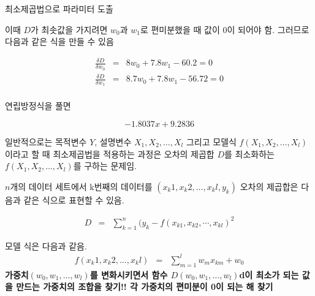 \documentclass[10pt,t]{beamer}
\begin{document}
\begin{frame} {최소제곱법으로 파라미터 도출}
\pagebreak 

이때 $D$가 최솟값을 가지려면 $w_0$과 $w_1$로 편미분했을 때 값이 0이 되어야 함. 그러므로 다음과 같은 식을 만들 수 있음

\begin{eqnarray*}
    \frac{\delta D}{\delta w_0} &=& 8 w_0 + 7.8 w_1 - 60.2 = 0\\
    \frac{\delta D}{\delta w_1} &=& 8.7 w_0 + 7.8 w_1 - 56.72 = 0\\
\end{eqnarray*}

연립방정식을 풀면

\[-1.8037 x + 9.2836 \]

\pagebreak

일반적으로는 목적변수 $Y$, 설명변수 $X_1, X_2, \ldots, X_l$ 그리고 모델식 $f(X_1, X_2, \ldots, X_l)$이라고 할 때 최소제곱법을 적용하는 과정은 오차의 제곱합 $D$를 최소화하는 $f(X_1, X_2, \ldots, X_l)$를 구하는 문제임.

$n$개의 데이터 세트에서 k번째의 데이터를 $(x_k1, x_k2, \ldots, x_kl, y_k)$ 오차의 제곱합은 다음과 같은 식으로 표현할 수 있음.

\begin{eqnarray*}
    D&=& \sum_{k=1} ^{n} (y_k - f(x_{k1}, x_{k2}, \cdots, x_{kl})^2
\end{eqnarray*}

모델 식은 다음과 같음.\vspace{-1em}
\begin{eqnarray*}
    f(x_k1, x_k2, \ldots, x_kl) &=& \sum_{m=1} ^{l} w_mx_{km}+w_0
\end{eqnarray*}
{\footnotesize \textbf{가중치$(w_0, w_1, \dots, w_l)$를 변화시키면서 함수 $D(w_0, w_1,\ldots, w_l)$d이 최소가 되는 값을 만드는 가중치의 조합을 찾기!!  각 가중치의 편미분이 0이 되는 해 찾기}}

\end{frame}
\end{document}
